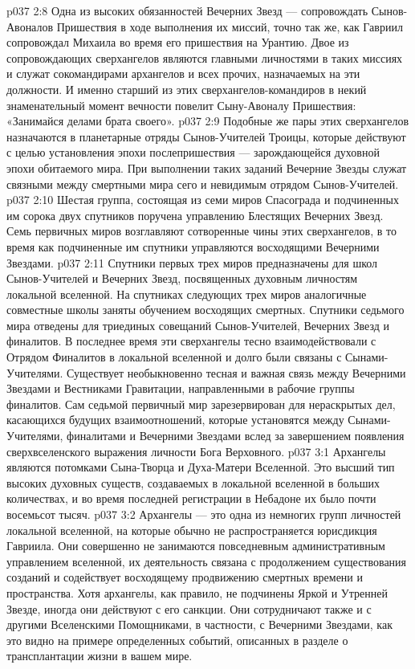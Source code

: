 \vs p037 2:8 Одна из высоких обязанностей Вечерних Звезд --- сопровождать Сынов\hyp{}Авоналов Пришествия в ходе выполнения их миссий, точно так же, как Гавриил сопровождал Михаила во время его пришествия на Урантию. Двое из сопровождающих сверхангелов являются главными личностями в таких миссиях и служат сокомандирами архангелов и всех прочих, назначаемых на эти должности. И именно старший из этих сверхангелов\hyp{}командиров в некий знаменательный момент вечности повелит Сыну\hyp{}Авоналу Пришествия: «Занимайся делами брата своего».
\vs p037 2:9 Подобные же пары этих сверхангелов назначаются в планетарные отряды Сынов\hyp{}Учителей Троицы, которые действуют с целью установления эпохи послепришествия --- зарождающейся духовной эпохи обитаемого мира. При выполнении таких заданий Вечерние Звезды служат связными между смертными мира сего и невидимым отрядом Сынов\hyp{}Учителей.
\vs p037 2:10 \pc {} Шестая группа, состоящая из семи миров Спасограда и подчиненных им сорока двух спутников поручена управлению Блестящих Вечерних Звезд. Семь первичных миров возглавляют сотворенные чины этих сверхангелов, в то время как подчиненные им спутники управляются восходящими Вечерними Звездами.
\vs p037 2:11 Спутники первых трех миров предназначены для школ Сынов\hyp{}Учителей и Вечерних Звезд, посвященных духовным личностям локальной вселенной. На спутниках следующих трех миров аналогичные совместные школы заняты обучением восходящих смертных. Спутники седьмого мира отведены для триединых совещаний Сынов\hyp{}Учителей, Вечерних Звезд и финалитов. В последнее время эти сверхангелы тесно взаимодействовали с Отрядом Финалитов в локальной вселенной и долго были связаны с Сынами\hyp{}Учителями. Существует необыкновенно тесная и важная связь между Вечерними Звездами и Вестниками Гравитации, направленными в рабочие группы финалитов. Сам седьмой первичный мир зарезервирован для нераскрытых дел, касающихся будущих взаимоотношений, которые установятся между Сынами\hyp{}Учителями, финалитами и Вечерними Звездами вслед за завершением появления сверхвселенского выражения личности Бога Верховного.
\vs p037 3:1 Архангелы являются потомками Сына\hyp{}Творца и Духа\hyp{}Матери Вселенной. Это высший тип высоких духовных существ, создаваемых в локальной вселенной в больших количествах, и во время последней регистрации в Небадоне их было почти восемьсот тысяч.
\vs p037 3:2 Архангелы --- это одна из немногих групп личностей локальной вселенной, на которые обычно не распространяется юрисдикция Гавриила. Они совершенно не занимаются повседневным административным управлением вселенной, их деятельность связана с продолжением существования созданий и содействует восходящему продвижению смертных времени и пространства. Хотя архангелы, как правило, не подчинены Яркой и Утренней Звезде, иногда они действуют с его санкции. Они сотрудничают также и с другими Вселенскими Помощниками, в частности, с Вечерними Звездами, как это видно на примере определенных событий, описанных в разделе о трансплантации жизни в вашем мире.
